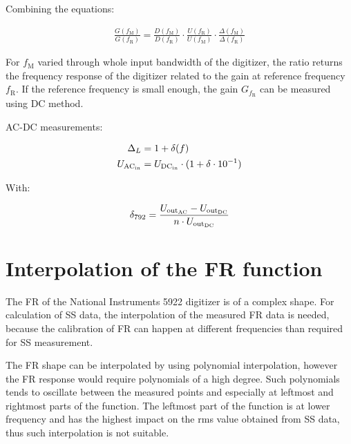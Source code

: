 \documentclass[a4paper, 12pt]{article}
\begin{document}
%
%
Combining the equations:

\begin{align}
	\frac{G(f_\text{M})}{G(f_\text{R})} = \frac{D(f_\text{M})}{D(f_\text{R})} \cdot \frac{U(f_\text{R})}{U(f_\text{M})} \cdot \frac{\Delta(f_\text{M})}{\Delta(f_\text{R})}
\end{align}


For $f_\text{M}$ varied through whole input bandwidth of the digitizer, the
ratio returns the frequency response of the digitizer related to the gain at
reference frequency $f_\text{R}$. If the reference frequency is small enough,
the gain $G_{f_\text{R}}$ can be measured using DC method.

\textcolor{red}{}

AC-DC measurements:

\begin{align}
	\Delta_L        & = 1 + \delta(f)                                    \\
	U_{\rm AC_{in}} & = U_{\rm DC_{in}} \cdot (1 + \delta \cdot 10^{-1})
\end{align}

With:

\begin{align}
	\delta_{792} = \frac{U_{\rm out_{AC}} - U_{\rm out_{DC}}}{n\cdot U_{\rm out_{DC}}}
\end{align}

\section{Interpolation of the FR function}
The FR of the National Instruments 5922 digitizer is of a complex shape. For
calculation of SS data, the interpolation of the measured FR data is needed,
because the calibration of FR can happen at different frequencies than required
for SS measurement.

The FR shape can be interpolated by using polynomial interpolation, however the
FR response would require polynomials of a high degree. Such polynomials tends to
oscillate between the measured points and especially at leftmost and rightmost
parts of the function. The leftmost part of the function is at lower frequency
and has the highest impact on the rms value obtained from SS data, thus such
interpolation is not suitable.
\end{document}
